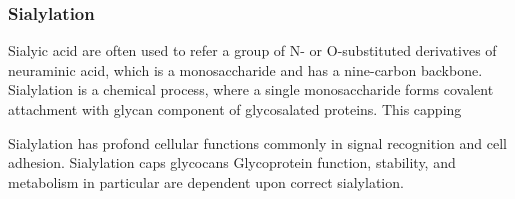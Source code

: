 \subsubsection {Sialylation}
Sialyic acid are often used to refer a group of N- or O-substituted derivatives of neuraminic acid, which is a monosaccharide and has a nine-carbon backbone.~\cite{Vocadlo_2009} Sialylation is a chemical process, where a single monosaccharide forms covalent attachment with glycan component of glycosalated proteins. This capping  

Sialylation has profond cellular functions commonly in signal recognition and cell adhesion. Sialylation caps glycocans Glycoprotein function, stability, and metabolism in particular are dependent upon correct sialylation.